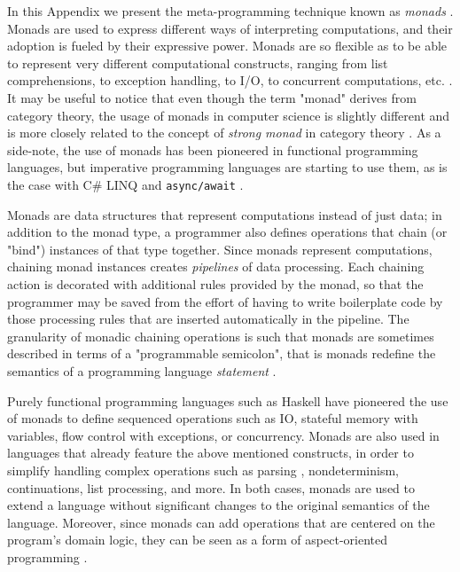 In this Appendix we present the meta-programming technique known as \textit{monads} \cite{APPENDIX_G_NOTIONS_OF_COMPUTATION_AND_MONADS}. Monads are used to express different ways of interpreting computations, and their adoption is fueled by their expressive power. Monads are so flexible as to be able to represent very different computational constructs, ranging from list comprehensions, to exception handling, to I/O, to concurrent computations, etc. \cite{APPENDIX_G_IMPERATIVE_FP, APPENDIX_G_ESSENCE_OF_FP, APPENDIX_G_COMPREHENDING_MONADS}. It may be useful to notice that even though the term "monad" derives from category theory, the usage of monads in computer science is slightly different and is more closely related to the concept of \textit{strong monad} in category theory \cite{APPENDIX_G_CATEGORY_THEORY}. As a side-note, the use of monads has been pioneered in functional programming languages, but imperative programming languages are starting to use them, as is the case with C\# LINQ \cite{CHAPTER_1_PL_INFLUENCE_ON_CURRENT_LANGUAGES} and \texttt{async/await} \cite{APPENDIX_G_CSHARP_ASYNC}.

Monads are data structures that represent computations instead of just data; in addition to the monad type, a programmer also defines operations that chain (or "bind") instances of that type together. Since monads represent computations, chaining monad instances creates \textit{pipelines} of data processing. Each chaining action is decorated with additional rules provided by the monad, so that the programmer may be saved from the effort of having to write boilerplate code by those processing rules that are inserted automatically in the pipeline. The granularity of monadic chaining operations is such that monads are sometimes described in terms of a "programmable semicolon", that is monads redefine the semantics of a programming language \textit{statement} \cite{APPENDIX_G_CATEGORY_THEORY}.

Purely functional programming languages such as Haskell have pioneered the use of monads to define sequenced operations such as IO, stateful memory with variables, flow control with exceptions, or concurrency. Monads are also used in languages that already feature the above mentioned constructs, in order to simplify handling complex operations such as parsing \cite{APPENDIX_G_MONADIC_PARSERS}, nondeterminism, continuations, list processing, and more. In both cases, monads are used to extend a language without significant changes to the original semantics of the language. Moreover, since monads can add operations that are centered on the program's domain logic, they can be seen as a form of aspect-oriented programming \cite{APPENDIX_G_MONADS_AND_ASPECTS}.

